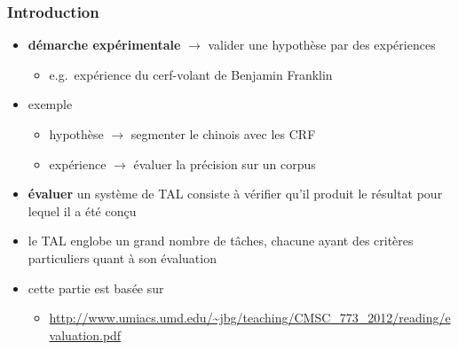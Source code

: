 
\begin{frame}[allowframebreaks]
\frametitle{Introduction}

\begin{itemize} \itemsep0.8em

    \item \textbf{démarche expérimentale} $\to$ valider une hypothèse par des 
          expériences
    \begin{itemize}
        \item e.g.~expérience du cerf-volant de Benjamin Franklin
    \end{itemize}

    \item exemple
    \begin{itemize}
        \item hypothèse $\to$ segmenter le chinois avec les CRF
        \item expérience $\to$ évaluer la précision sur un corpus
    \end{itemize}    

    \item \textbf{évaluer} un système de TAL consiste à vérifier qu'il produit 
          le résultat pour lequel il a été conçu

    \framebreak

    \item le TAL englobe un grand nombre de tâches, chacune ayant des critères 
          particuliers quant à son évaluation

    \item cette partie est basée sur~\cite{resnik2010}
    \begin{itemize}
        \item \url{http://www.umiacs.umd.edu/~jbg/teaching/CMSC_773_2012/reading/evaluation.pdf}
    \end{itemize}
\end{itemize}

\end{frame}

